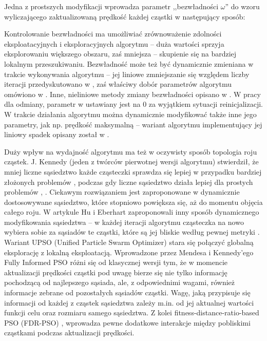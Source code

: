 \documentclass[12pt, twoside, openany, abstract=on]{report}
\theoremstyle{definition}
\begin{document}
Jedna z prostszych modyfikacji 
wprowadza parametr ,,bezwładności $\omega$'' do wzoru wyliczającego zaktualizowaną prędkość każdej cząstki w następujący sposób:

Kontrolowanie bezwładności ma umożliwiać zrównoważenie zdolności eksploatacyjnych i eksploracyjnych algorytmu 
 – duża wartości sprzyja eksplorowaniu większego obszaru, zaś mniejsza – skupienie się na bardziej lokalnym przeszukiwaniu. Bezwładność może też być dynamicznie zmieniana w trakcie wykonywania algorytmu – jej liniowe zmniejszanie się względem liczby iteracji przedyskutowano w \cite{ModPsoInertia}, zaś właściwy dobór parametrów algorytmu omówiono w \cite{ParamSelPso}. Inne, nieliniowe metody zmiany bezwładności opisano w \cite{PsoFuzzyInertia}. W pracy \cite{SelfOrgHPso} dla odmiany, parametr w ustawiany jest na 0 za wyjątkiem sytuacji reinicjalizacji.
W trakcie działania algorytmu można dynamicznie modyfikować także inne jego parametry, jak np. prędkość maksymalną – wariant algorytmu implementujący jej liniowy spadek opisany został w \cite{VmaxPso}.

Duży wpływ na wydajność algorytmu ma też w oczywisty sposób topologia 
roju cząstek. J. Kennedy (jeden z twórców pierwotnej wersji algorytmu) stwierdził, że mniej liczne sąsiedztwo każde cząsteczki sprawdza się lepiej w przypadku bardziej złożonych problemów 
, podczas gdy liczne sąsiedztwo działa lepiej dla prostych problemów \cite{TopologyPso}, \cite{PopStructPso}. Ciekawym rozwiązaniem jest zaproponowane w \cite{PsoNeighOp} dynamicznie dostosowywane sąsiedztwo, które stopniowo powiększa się, aż do momentu objęcia całego roju. W artykule \cite{MultiobjDynNeighPso} Hu i Eberhart zaproponowali inny sposób dynamicznego modyfikowania sąsiedztwa – w każdej iteracji algorytmu cząsteczka na nowo wybiera sobie za sąsiadów te cząstki, które są jej bliskie według pewnej metryki 
. Wariant UPSO (Unified Particle Swarm Optimizer) \cite{UPso} stara się połączyć globalną eksplorację z lokalną eksploatacją.
Wprowadzone przez Mendesa i Kennedy’ego \cite{FullyInformedPso} Fully Informed PSO różni się od klasycznej wersji tym, że w momencie aktualizacji prędkości cząstki pod uwagę bierze się nie tylko informację pochodzącą od najlepszego sąsiada, ale, z odpowiednimi wagami, również  informacje zebrane od pozostałych sąsiadów cząstki. Wagę, jaką przypisuje się informacji od każdej z cząstek sąsiedztwa zależy m.in. od jej aktualnej wartości funkcji celu oraz rozmiaru samego sąsiedztwa. 
 Z kolei fitness-distance-ratio-based PSO (FDR-PSO) \cite{FitnessDistRatio}, wprowadza pewne dodatkowe interakcje 
między pobliskimi cząstkami podczas aktualizacji prędkości.
\end{document}
